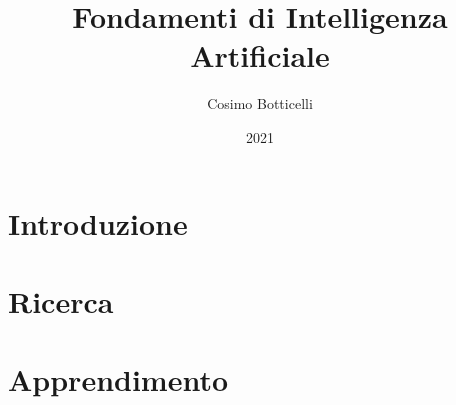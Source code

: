 \documentclass[12pt]{report}
\title{Fondamenti di Intelligenza Artificiale}
\author{Cosimo Botticelli}
\date{2021}
\begin{document}
\maketitle
\tableofcontents

\chapter{Introduzione}



\chapter{Ricerca}


\chapter{Apprendimento}

\end{document}
